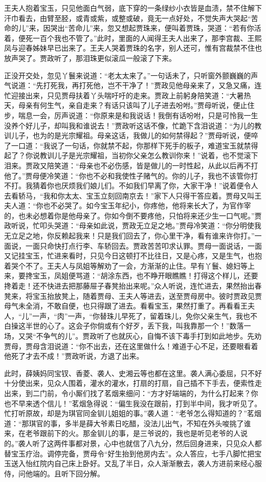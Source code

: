 \documentclass[12pt,oneside]{book}
\begin{document}
王夫人抱着宝玉，只见他面白气弱，底下穿的一条绿纱小衣皆是血渍，禁不住解下汗巾看去，由臂至胫，或青或紫，或整或破，竟无一点好处，不觉失声大哭起“苦命的儿”来，因哭出“苦命儿”来，忽又想起贾珠来，便叫着贾珠，哭道：“若有你活着，便死一百个我也不管了。”此时，里面的人闻得王夫人出来了，那李宫裁、王熙凤与迎春姊妹早已出来了。王夫人哭着贾珠的名字，别人还可，惟有宫裁禁不住也放声哭了。贾政听了，那泪珠更似滚瓜一般滚了下来。

正没开交处，忽见丫鬟来说道：“老太太来了。”一句话未了，只听窗外颤巍巍的声气说道：“先打死我，再打死他，岂不干净了！”贾政见他母亲来了，又急又痛，连忙迎接出来，只见贾母扶着丫头喘吁吁的走来。贾政上前躬身陪笑道：“大暑热天，母亲有何生气，亲自走来？有话只该叫了儿子进去吩咐。”贾母听说，便止住步，喘息一会，厉声说道：“你原来是和我说话！我倒有话吩咐，只是可怜我一生没养个好儿子，却叫我和谁说去！”贾政听这话不像，忙跪下含泪说道：“为儿的教训儿子，也为的是光宗耀祖。母亲这话，我做儿的如何禁得起？”贾母听说，便啐了一口道：“我说了一句话，你就禁不起，你那样下死手的板子，难道宝玉就禁得起了？你说教训儿子是光宗耀祖，当初你父亲怎么教训你来！”说着，也不觉滚下泪来。贾政又陪笑道：“母亲也不必伤感，皆是做儿的一时性起，从此以后再不打他了。”贾母便冷笑道：“你也不必和我使性子赌气的。你的儿子，我也不该管你打不打。我猜着你也厌烦我们娘儿们。不如我们早离了你，大家干净！”说着便令人去看轿马，“我和你太太、宝玉立刻回南京去！”家下人只得干答应着。贾母又叫王夫人道：“你也不必哭了。如今宝玉年纪小，你疼他，他将来长大了，为官作宰的，也未必想着你是他母亲了。你如今倒不要疼他，只怕将来还少生一口气呢。”贾政听说，忙叩头哭道：“母亲如此说，贾政无立足之地。”贾母冷笑道：“你分明使我无立足之地，你反赖起我来！只是我们回去了，你心里干净，看有谁来许你打。”一面说，一面只命快打点行李、车轿回去。贾政苦苦叩求认罪。贾母一面说话，一面又记挂宝玉，忙进来看时，只见今日这顿打不比往日，又是心疼，又是生气，也抱着哭个不了。王夫人与凤姐等解劝了一会，方渐渐的止住。早有丫鬟、媳妇等上来，要搀宝玉，凤姐便骂道：“胡涂东西，也不睁开眼瞧瞧！打得这个样儿，还要搀着走！还不快进去把那藤屉子春凳抬出来呢。”众人听说，连忙进去，果然抬出春凳来，将宝玉抬放凳上，随着贾母、王夫人等进去，送至贾母房中。彼时贾政见贾母气未全消，不敢自便，也只得跟了进去。看看宝玉，果然打重了。再看看王夫人，“儿”一声，“肉”一声，“你替珠儿早死了，留着珠儿，免你父亲生气，我也不白操这半世的心了。这会子你倘或有个好歹，丢下我，叫我靠那一个！”数落一场，又哭“不争气的儿”。贾政听了也就灰心，自悔不该下毒手打到如此地步。先劝贾母，贾母含泪说道：“你不出去，还在这里做什么！难道于心不足，还要眼看着他死了才去不成！”贾政听说，方退了出来。

此时，薛姨妈同宝钗、香菱、袭人、史湘云等也都在这里。袭人满心委屈，只不好十分使出来，见众人围着，灌水的灌水，打扇的打扇，自己插不下手去，便索性走出来，到二门前，令小厮们找了茗烟来细问：“方才好端端的，为什么打起来？你也不早来透个信儿！”茗烟急得说：“偏生我没在跟前，打到半中间，我才听见了。忙打听原故，却是为琪官同金钏儿姐姐的事。”袭人道：“老爷怎么得知道的？”茗烟道：“那琪官的事，多半是薛大爷素日吃醋，没法儿出气，不知在外头唆挑了谁来，在老爷跟前下的火。那金钏儿的事，是三爷说的，我也是听见老爷的人说的。”袭人听了这两件事都对景，心中也就信了八九分，然后回身进来，只见众人都替宝玉疗治。调停完备，贾母令“好生抬到他房内去”。众人答应，七手八脚忙把宝玉送入怡红院内自己床上卧好。又乱了半日，众人渐渐散去，袭人方进前来经心服侍，问他端的。且听下回分解。
\end{document}
